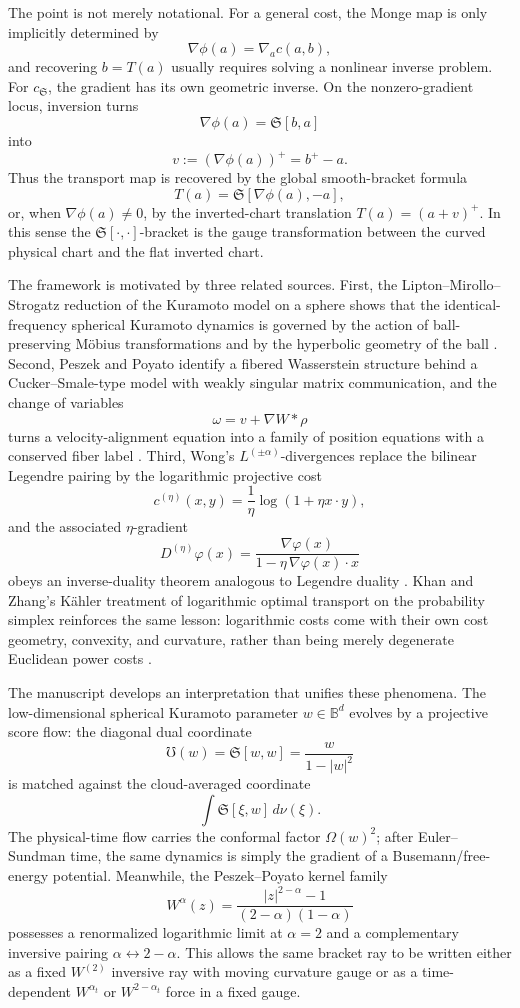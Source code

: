 \documentclass[11pt]{article}
\newcommand{\B}{\mathbb{B}}
\newcommand{\norm}[1]{\left|#1\right|}
\newcommand{\cs}{c_{\mathfrak S}}
\newcommand{\grad}{\nabla}
\newcommand{\UU}{\mho}
\newcommand{\Sbr}[2]{\mathfrak S[#1,#2]}
\newcommand{\Om}{\Omega}
\begin{document}
The point is not merely notational.  For a general cost, the Monge map is only implicitly determined by
\[
    \grad\phi(a)=\grad_a c(a,b),
\]
and recovering $b=T(a)$ usually requires solving a nonlinear inverse problem.  For $\cs$, the gradient has its own geometric inverse.  On the nonzero-gradient locus, inversion turns
\[
    \grad\phi(a)=\Sbr{b}{a}
\]
into
\[
    v:=(\grad\phi(a))^+=b^+-a.
\]
Thus the transport map is recovered by the global smooth-bracket formula
\[
    T(a)=\Sbr{\grad\phi(a)}{-a},
\]
or, when $\grad\phi(a)\neq0$, by the inverted-chart translation $T(a)=(a+v)^+$.
In this sense the $\Sbr{\cdot}{\cdot}$-bracket is the gauge transformation between the curved physical chart and the flat inverted chart.

The framework is motivated by three related sources.  First, the Lipton--Mirollo--Strogatz reduction of the Kuramoto model on a sphere shows that the identical-frequency spherical Kuramoto dynamics is governed by the action of ball-preserving Möbius transformations and by the hyperbolic geometry of the ball \cite{LMS2021}.  Second, Peszek and Poyato identify a fibered Wasserstein structure behind a Cucker--Smale-type model with weakly singular matrix communication, and the change of variables
\[
    \omega=v+\grad W*\rho
\]
turns a velocity-alignment equation into a family of position equations with a conserved fiber label \cite{PeszekPoyato2022Fibered,PeszekPoyato2022CS}.  Third, Wong's $L^{(\pm\alpha)}$-divergences replace the bilinear Legendre pairing by the logarithmic projective cost
\[
    c^{(\eta)}(x,y)=\frac1\eta\log(1+\eta x\cdot y),
\]
and the associated $\eta$-gradient
\[
    D^{(\eta)}\varphi(x)=\frac{\grad\varphi(x)}{1-\eta\,\grad\varphi(x)\cdot x}
\]
obeys an inverse-duality theorem analogous to Legendre duality \cite{Wong2018}.  Khan and Zhang's K\"ahler treatment of logarithmic optimal transport on the probability simplex reinforces the same lesson: logarithmic costs come with their own cost geometry, convexity, and curvature, rather than being merely degenerate Euclidean power costs \cite{KhanZhang2020}.

The manuscript develops an interpretation that unifies these phenomena.  The low-dimensional spherical Kuramoto parameter $w\in\B^d$ evolves by a projective score flow: the diagonal dual coordinate
\[
    \UU(w)=\Sbr{w}{w}=\frac{w}{1-\norm w^2}
\]
is matched against the cloud-averaged coordinate
\[
    \int\Sbr{\xi}{w}\,d\nu(\xi).
\]
The physical-time flow carries the conformal factor $\Om(w)^2$; after Euler--Sundman time, the same dynamics is simply the gradient of a Busemann/free-energy potential.  Meanwhile, the Peszek--Poyato kernel family
\[
    W^\alpha(z)=\frac{\norm z^{2-\alpha}-1}{(2-\alpha)(1-\alpha)}
\]
possesses a renormalized logarithmic limit at $\alpha=2$ and a complementary inversive pairing $\alpha\leftrightarrow 2-\alpha$.  This allows the same bracket ray to be written either as a fixed $W^{(2)}$ inversive ray with moving curvature gauge or as a time-dependent $W^{\alpha_t}$ or $W^{2-\alpha_t}$ force in a fixed gauge.
\end{document}
